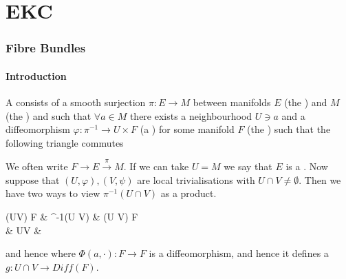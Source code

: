 \documentclass{article}
\begin{document}
\part{EKC}
\section{Fibre Bundles}
\subsection{Introduction}
\begin{definition}
	A  consists of a smooth surjection $\pi : E \to M$ between manifolds $E$ (the ) and $M$ (the ) and such that $\forall a \in M$ there exists a neighbourhood $U \ni a$ and a diffeomorphism $\varphi : \pi^{-1} \to U \times F$ (a ) for some manifold $F$ (the ) such that the following triangle commutes 
	\begin{center}
	\end{center}
\end{definition}

We often write $F \to E \overset{\pi}{\to} M$. If we can take $U = M$ we say that $E$ is a . Now suppose that $(U,\varphi), (V,\psi)$ are local trivialisations with $U \cap V \neq \emptyset$. Then we have two ways to view $\pi^{-1}(U \cap V)$ as a product. 
\begin{tkz}
	(U\cap V) \times F \arrow[dr,"pr_2"] & \pi^{-1}(U \cap V) \arrow[l,"\psi"] \arrow[d,"\pi"] \arrow[r,"\varphi"] & (U \cap V) \times F \arrow[dl,"pr_2"] \\ & U\cap V & 
\end{tkz}
and hence 
where $\Phi(a,\cdot) : F \to F$ is a diffeomorphism, and hence it defines a  $g : U \cap V \to Diff(F)$. 
\end{document}
